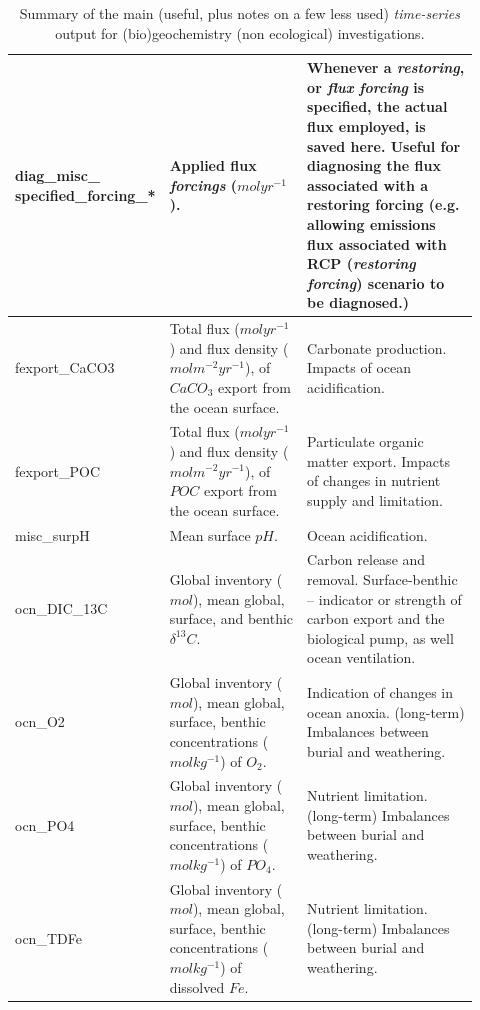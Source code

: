 \documentclass[11pt,fleqn]{book} %
\begin{document}
\begin{table}[ht]
\begin{tabular}{p{0.2\linewidth} p{0.317\linewidth} p{0.4\linewidth}}
\midrule

\textsf{\footnotesize diag\_misc\_} \hspace{1cm} \textsf{\footnotesize specified\_forcing\_*}  & \small{Applied flux \textit{forcings} (\(molyr^{-1}\)).} & \small{Whenever a \textit{restoring}, or \textit{flux} \textit{forcing} is specified, the actual flux employed, is saved here. Useful for diagnosing the flux associated with a restoring forcing (e.g. allowing  emissions flux associated with RCP (\textit{restoring forcing}) scenario to be diagnosed.)}\\

\midrule

\textsf{\footnotesize fexport\_CaCO3} & \small{Total flux (\(molyr^{-1}\)) and flux density (\(molm^{-2}yr^{-1}\)), of \(CaCO_{3}\) export from the ocean surface. } & \small{Carbonate production. Impacts of ocean acidification.}\\
\textsf{\footnotesize fexport\_POC} & \small{Total flux (\(molyr^{-1}\)) and flux density (\(molm^{-2}yr^{-1}\)), of \(POC\) export from the ocean surface. } & \small{Particulate organic matter export. Impacts of changes in nutrient supply and limitation.}\\

\midrule

\textsf{\footnotesize misc\_surpH} & \small{Mean surface \(pH\).} & \small{Ocean acidification.}\\

\midrule

\textsf{\footnotesize ocn\_DIC\_13C} & \small{Global inventory (\(mol\)), mean global,  surface, and  benthic \(\delta^{13}C\).} & \small{Carbon release and removal. Surface-benthic -- indicator or strength of carbon export and the biological pump, as well ocean ventilation.}\\
\textsf{\footnotesize ocn\_O2} & \small{Global inventory (\(mol\)), mean global,  surface, benthic concentrations (\(molkg^{-1}\)) of \(O_{2}\).} & \small{Indication of changes in ocean anoxia. (long-term) Imbalances between burial and weathering.}\\
\textsf{\footnotesize ocn\_PO4} & \small{Global inventory (\(mol\)), mean global,  surface,  benthic concentrations (\(molkg^{-1}\)) of \(PO_{4}\).} & \small{Nutrient limitation. (long-term) Imbalances between burial and weathering.}\\
\textsf{\footnotesize ocn\_TDFe} & \small{Global inventory (\(mol\)), mean global,  surface,  benthic concentrations (\(molkg^{-1}\)) of dissolved \(Fe\).} & \small{Nutrient limitation. (long-term) Imbalances between burial and weathering.}\\

\bottomrule
\end{tabular}
\caption{Summary of the main (useful, plus notes on a few less used) \textit{time-series} output for (bio)geochemistry (non ecological) investigations.}
\end{table}
\end{document}
